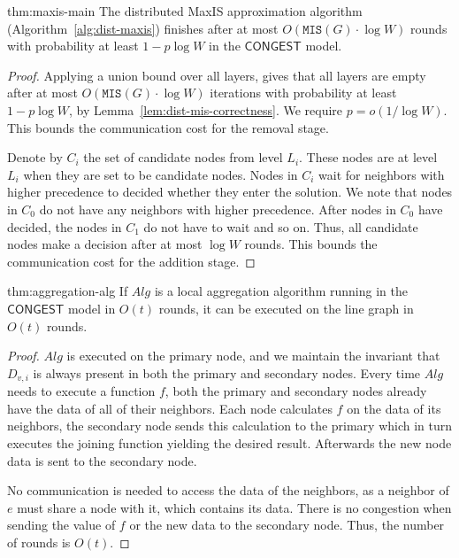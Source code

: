 \documentclass[11pt]{article}
\newenvironment{theorem-repeat}[1]{\begin{trivlist}
\item[\hspace{\labelsep}{\bf\noindent Theorem \ref{#1} }]\em }%
{\end{trivlist}}
\newcommand{\Wmax}{W}%
\newcommand{\Dvi}{D_{v,i}}
\newcommand{\MIS}{\texttt{MIS}(G)}
\begin{document}
\begin{theorem-repeat}{thm:maxis-main}
	The distributed MaxIS approximation algorithm (Algorithm~\ref{alg:dist-maxis}) finishes after at most $O(\MIS\cdot \log \Wmax)$ rounds with probability at least $1-p\log \Wmax$ in the $\mathsf{CONGEST}$ model. 
\end{theorem-repeat}
\begin{proof}
	Applying a union bound over all layers, gives that all layers are empty after at most $O({\MIS\cdot \log \Wmax})$ iterations with probability at least $1-p\log \Wmax$, by Lemma~\ref{lem:dist-mis-correctness}. We require $p=o(1/\log \Wmax)$. This bounds the communication cost for the removal stage.
	
	Denote by $C_i$ the set of candidate nodes from level $L_i$. These nodes are at level $L_i$ when they are set to be candidate nodes.
	Nodes in $C_i$ wait for neighbors with higher precedence to decided whether they enter the solution. We note that nodes in $C_0$ do not have any neighbors with higher precedence. After nodes in $C_0$ have decided, the nodes in $C_1$ do not have to wait and so on. Thus, all candidate nodes make a decision after at most $\log \Wmax$ rounds. This bounds the communication cost for the addition stage.
\end{proof}
\begin{theorem-repeat}{thm:aggregation-alg}
	If $Alg$ is a local aggregation algorithm running in the $\mathsf{CONGEST}$ model in $O(t)$ rounds, it can be executed on the line graph in $O(t)$ rounds.
\end{theorem-repeat}
\begin{proof}
	$Alg$ is executed on the primary node, and we maintain the invariant that $\Dvi$ is always present in both the primary and secondary nodes. Every time $Alg$ needs to execute a function $f$, both the primary and secondary nodes already have the data of all of their neighbors. Each node calculates $f$ on the data of its neighbors, the secondary node sends this calculation to the primary which in turn executes the joining function yielding the desired result. Afterwards the new node data is sent to the secondary node.
	
	No communication is needed to access the data of the neighbors, as a neighbor of $e$ must share a node with it, which contains its data. There is no congestion when sending the value of $f$ or the new data to the secondary node. Thus, the number of rounds is $O(t)$.
\end{proof}
\end{document}

